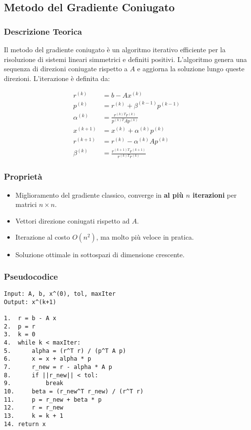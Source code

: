 \subsection{Metodo del Gradiente Coniugato}

\subsubsection*{Descrizione Teorica}

Il metodo del gradiente coniugato è un algoritmo iterativo efficiente per la risoluzione di sistemi lineari simmetrici e definiti positivi. L'algoritmo genera una sequenza di direzioni coniugate rispetto a $A$ e aggiorna la soluzione lungo queste direzioni. L'iterazione è definita da:

\[
\begin{aligned}
r^{(k)} &= b - A x^{(k)} \\
p^{(k)} &= r^{(k)} + \beta^{(k-1)} p^{(k-1)} \\
\alpha^{(k)} &= \frac{r^{(k)T} r^{(k)}}{p^{(k)T} A p^{(k)}} \\
x^{(k+1)} &= x^{(k)} + \alpha^{(k)} p^{(k)} \\
r^{(k+1)} &= r^{(k)} - \alpha^{(k)} A p^{(k)} \\
\beta^{(k)} &= \frac{r^{(k+1)T} r^{(k+1)}}{r^{(k)T} r^{(k)}}
\end{aligned}
\]

\subsubsection*{Proprietà}
\begin{itemize}
    \item Miglioramento del gradiente classico, converge in \textbf{al più \(n\) iterazioni} per matrici \(n \times n\).
    \item Vettori direzione coniugati rispetto ad \(A\).
    \item Iterazione al costo \(O(n^2)\), ma molto più veloce in pratica.
    \item Soluzione ottimale in sottospazi di dimensione crescente.
\end{itemize}

\subsubsection*{Pseudocodice}

\begin{footnotesize}
\begin{verbatim}
Input: A, b, x^(0), tol, maxIter
Output: x^(k+1)

1.  r = b - A x
2.  p = r
3.  k = 0
4.  while k < maxIter:
5.      alpha = (r^T r) / (p^T A p)
6.      x = x + alpha * p
7.      r_new = r - alpha * A p
8.      if ||r_new|| < tol:
9.          break
10.     beta = (r_new^T r_new) / (r^T r)
11.     p = r_new + beta * p
12.     r = r_new
13.     k = k + 1
14. return x
\end{verbatim}
\end{footnotesize}

